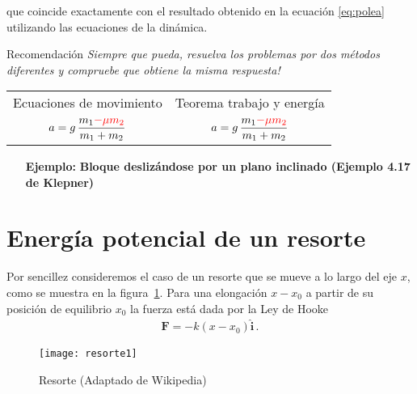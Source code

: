 \noindent
que coincide exactamente con el resultado obtenido en la ecuación \eqref{eq:polea} utilizando las ecuaciones de la dinámica. 

\begin{frame}
  \begin{block}{Recomendación}
    \emph{Siempre que pueda, resuelva los problemas por dos métodos diferentes y compruebe que obtiene la misma respuesta!}
    \begin{center}
          \begin{tabular}{cc}
      Ecuaciones de movimiento & Teorema trabajo y energía\\
      $\displaystyle a=g\,\frac{m_1{\color{red}-\mu m_2}}{m_1+m_2}$&
      $\displaystyle a=g\,\frac{m_1{\color{red}-\mu m_2}}{m_1+m_2}$\\
    \end{tabular}
    \end{center}
  \end{block}
\end{frame}

\begin{inprogress}
  \begin{itemize}
  \item[\textbf{Ejemplo:}] \textbf{Bloque deslizándose por un plano
      inclinado (Ejemplo 4.17 de Klepner)}\\
  \end{itemize}
\end{inprogress}


\section{Energía potencial de un resorte}
Por sencillez consideremos el caso de un resorte que se mueve a lo largo del eje $x$, como se muestra en la figura~\ref{fig:resorte}. Para una elongación $x-x_0$ a partir de su posición de equilibrio $x_0$ la fuerza está dada por la Ley de Hooke
\begin{align}
  \mathbf{F}=-k(x-x_0)\hat{\mathbf{i}}\,.
\end{align}
\begin{frame}
  \begin{figure}
    \centering
{\texttt{[image: resorte1]}}
    \caption{Resorte (Adaptado de Wikipedia)}
    \label{fig:resorte}
  \end{figure}
\end{frame}

